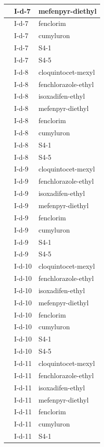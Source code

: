 \documentclass[11pt,a4paper]{article}
\begin{document}
\begin{table}[h]
\begin{tabular}{|l|l|l|}
 & I-d-7 & mefenpyr-diethyl \\ \hline
 & I-d-7 & fenclorim \\ \hline
 & I-d-7 & cumyluron \\ \hline
 & I-d-7 & S4-1 \\ \hline
 & I-d-7 & S4-5 \\ \hline
 & I-d-8 & cloquintocet-mexyl \\ \hline
 & I-d-8 & fenchlorazole-ethyl \\ \hline
 & I-d-8 & isoxadifen-ethyl \\ \hline
 & I-d-8 & mefenpyr-diethyl \\ \hline
 & I-d-8 & fenclorim \\ \hline
 & I-d-8 & cumyluron \\ \hline
 & I-d-8 & S4-1 \\ \hline
 & I-d-8 & S4-5 \\ \hline
 & I-d-9 & cloquintocet-mexyl \\ \hline
 & I-d-9 & fenchlorazole-ethyl \\ \hline
 & I-d-9 & isoxadifen-ethyl \\ \hline
 & I-d-9 & mefenpyr-diethyl \\ \hline
 & I-d-9 & fenclorim \\ \hline
 & I-d-9 & cumyluron \\ \hline
 & I-d-9 & S4-1 \\ \hline
 & I-d-9 & S4-5 \\ \hline
 & I-d-10 & cloquintocet-mexyl \\ \hline
 & I-d-10 & fenchlorazole-ethyl \\ \hline
 & I-d-10 & isoxadifen-ethyl \\ \hline
 & I-d-10 & mefenpyr-diethyl \\ \hline
 & I-d-10 & fenclorim \\ \hline
 & I-d-10 & cumyluron \\ \hline
 & I-d-10 & S4-1 \\ \hline
 & I-d-10 & S4-5 \\ \hline
 & I-d-11 & cloquintocet-mexyl \\ \hline
 & I-d-11 & fenchlorazole-ethyl \\ \hline
 & I-d-11 & isoxadifen-ethyl \\ \hline
 & I-d-11 & mefenpyr-diethyl \\ \hline
 & I-d-11 & fenclorim \\ \hline
 & I-d-11 & cumyluron \\ \hline
 & I-d-11 & S4-1 \\ \hline

\end{tabular}
\end{table}
\end{document}
